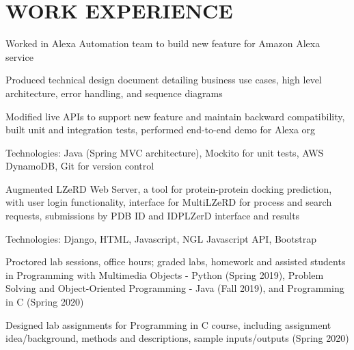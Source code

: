 \documentclass[]{deedy-resume-openfont}
\begin{document}
\begin{minipage}[t]{0.67\textwidth} 


\section{WORK EXPERIENCE}

\vspace{\topsep} %
\begin{tightemize}
\item Worked in Alexa Automation team to build new feature for Amazon Alexa service
\item Produced technical design document detailing business use cases, high level architecture, error handling, and sequence diagrams
\item Modified live APIs to support new feature and maintain backward compatibility, built unit and integration tests, performed end-to-end demo for Alexa org
\item Technologies: Java (Spring MVC architecture), Mockito for unit tests, AWS DynamoDB, Git for version control
\end{tightemize}
\sectionsep

\begin{tightemize}
\item Augmented LZeRD Web Server, a tool for protein-protein docking prediction, with user login functionality, interface for MultiLZeRD for process and search requests, submissions by PDB ID and IDPLZerD interface and results
\item Technologies: Django, HTML, Javascript, NGL Javascript API, Bootstrap
\end{tightemize}
\sectionsep

\begin{tightemize}
\item Proctored lab sessions, office hours; graded labs, homework and assisted students in Programming with Multimedia Objects - Python (Spring 2019), Problem Solving and Object-Oriented Programming - Java (Fall 2019), and Programming in C (Spring 2020)
\item Designed lab assignments for Programming in C course, including assignment idea/background, methods and descriptions, sample inputs/outputs (Spring 2020)
\end{tightemize}
\sectionsep


\end{minipage}
\end{document}
